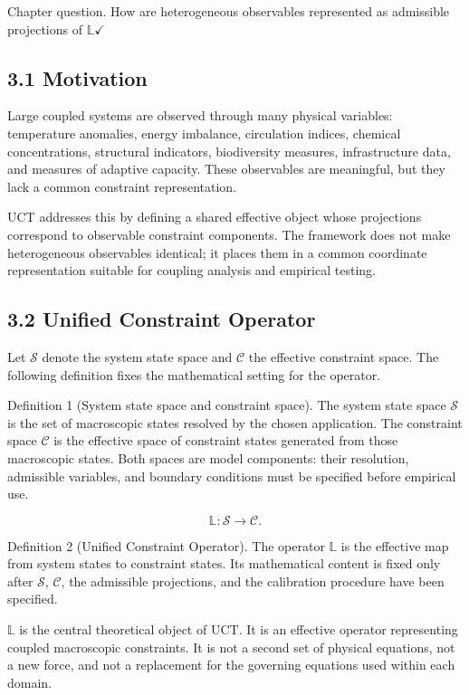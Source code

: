 \documentclass[aps,pre,reprint,superscriptaddress,nofootinbib]{revtex4-2}
\begin{document}
Chapter question. How are heterogeneous observables represented as admissible projections of \(\mathbb{L}\)$\checkmark$

\subsection{3.1 Motivation}

Large coupled systems are observed through many physical variables: temperature anomalies, energy imbalance, circulation indices, chemical concentrations, structural indicators, biodiversity measures, infrastructure data, and measures of adaptive capacity. These observables are meaningful, but they lack a common constraint representation.

UCT addresses this by defining a shared effective object whose projections correspond to observable constraint components. The framework does not make heterogeneous observables identical; it places them in a common coordinate representation suitable for coupling analysis and empirical testing.

\subsection{3.2 Unified Constraint Operator}

Let \(\mathcal{S}\) denote the system state space and \(\mathcal{C}\) the effective constraint space. The following definition fixes the mathematical setting for the operator.

Definition 1 (System state space and constraint space). The system state space \(\mathcal{S}\) is the set of macroscopic states resolved by the chosen application. The constraint space \(\mathcal{C}\) is the effective space of constraint states generated from those macroscopic states. Both spaces are model components: their resolution, admissible variables, and boundary conditions must be specified before empirical use.

\[ \mathbb{L}:\mathcal{S}\rightarrow\mathcal{C}. \]

Definition 2 (Unified Constraint Operator). The operator \(\mathbb{L}\) is the effective map from system states to constraint states. Its mathematical content is fixed only after \(\mathcal{S}\), \(\mathcal{C}\), the admissible projections, and the calibration procedure have been specified.

\(\mathbb{L}\) is the central theoretical object of UCT. It is an effective operator representing coupled macroscopic constraints. It is not a second set of physical equations, not a new force, and not a replacement for the governing equations used within each domain.
\end{document}
